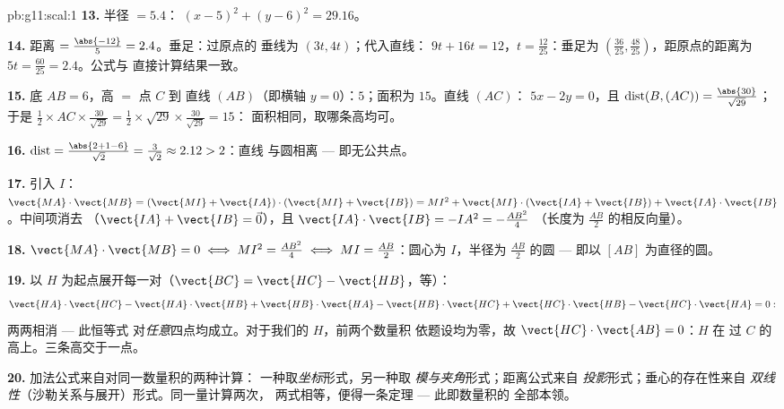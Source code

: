 \begin{solution}{pb:g11:scal:1}
\textbf{13.} 半径 $= 5.4$：
$(x - 5)^2 + (y - 6)^2 = 29.16$。

\textbf{14.} 距离 $= \frac{\abs{-12}}{5} = 2.4$。垂足：过原点的
垂线为 $(3t, 4t)$；代入直线：
$9t + 16t = 12$，$t = \frac{12}{25}$：垂足为
$\left(\frac{36}{25}, \frac{48}{25}\right)$，距原点的距离为
$5t = \frac{60}{25} = 2.4$。公式与
直接计算结果一致。

\textbf{15.} 底 $AB = 6$，高 $=$ 点 $C$ 到
直线 $(AB)$（即横轴 $y = 0$）：$5$；面积为 $15$。直线 $(AC)$：
$5x - 2y = 0$，且
$\operatorname{dist}(B, (AC)) = \frac{\abs{30}}{\sqrt{29}}$；
于是 $\frac12 \times AC \times \frac{30}{\sqrt{29}} =
\frac12 \times \sqrt{29} \times \frac{30}{\sqrt{29}} = 15$：
面积相同，取哪条高均可。

\textbf{16.} $\operatorname{dist} = \frac{\abs{2 + 1 - 6}}
{\sqrt2} = \frac{3}{\sqrt2} \approx 2.12 > 2$：直线
与圆相离 --- 即无公共点。

\textbf{17.} 引入 $I$：
$\vect{MA} \cdot \vect{MB} = (\vect{MI} + \vect{IA}) \cdot
(\vect{MI} + \vect{IB}) = MI^2 + \vect{MI} \cdot (\vect{IA} +
\vect{IB}) + \vect{IA} \cdot \vect{IB}$。中间项消去
（$\vect{IA} + \vect{IB} = \vec 0$），且
$\vect{IA} \cdot \vect{IB} = -IA^2 = -\frac{AB^2}{4}$
（长度为 $\frac{AB}2$ 的相反向量）。

\textbf{18.} $\vect{MA} \cdot \vect{MB} = 0 \iff MI^2 =
\frac{AB^2}{4} \iff MI = \frac{AB}{2}$：圆心为
$I$，半径为 $\frac{AB}2$ 的圆 --- 即以
$[AB]$ 为直径的圆。

\textbf{19.} 以 $H$ 为起点展开每一对（$\vect{BC} =
\vect{HC} - \vect{HB}$，等）：
\[
\vect{HA} \cdot \vect{HC} - \vect{HA} \cdot \vect{HB}
+ \vect{HB} \cdot \vect{HA} - \vect{HB} \cdot \vect{HC}
+ \vect{HC} \cdot \vect{HB} - \vect{HC} \cdot \vect{HA} = 0 :
\]
两两相消 --- 此恒等式
对\emph{任意}四点均成立。对于我们的 $H$，前两个数量积
依题设均为零，故
$\vect{HC} \cdot \vect{AB} = 0$：$H$ 在
过 $C$ 的高上。三条高交于一点。

\textbf{20.} 加法公式来自对同一数量积的两种计算：
一种取\emph{坐标}形式，另一种取
\emph{模与夹角}形式；距离公式来自
\emph{投影}形式；垂心的存在性来自
\emph{双线性}（沙勒关系与展开）形式。同一量计算两次，
两式相等，便得一条定理 --- 此即数量积的
全部本领。
\end{solution}
